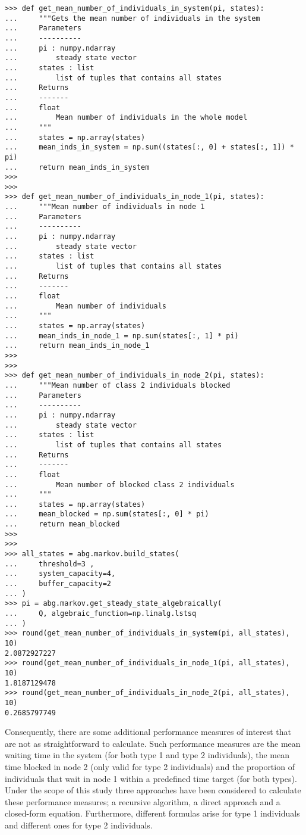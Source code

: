 \begin{lstlisting}[style=pystyle]
>>> def get_mean_number_of_individuals_in_system(pi, states):
...     """Gets the mean number of individuals in the system
...     Parameters
...     ----------
...     pi : numpy.ndarray
...         steady state vector
...     states : list
...         list of tuples that contains all states
...     Returns
...     -------
...     float
...         Mean number of individuals in the whole model
...     """
...     states = np.array(states)
...     mean_inds_in_system = np.sum((states[:, 0] + states[:, 1]) * pi)
...     return mean_inds_in_system
>>>
>>>
>>> def get_mean_number_of_individuals_in_node_1(pi, states):
...     """Mean number of individuals in node 1
...     Parameters
...     ----------
...     pi : numpy.ndarray
...         steady state vector
...     states : list
...         list of tuples that contains all states
...     Returns
...     -------
...     float
...         Mean number of individuals
...     """
...     states = np.array(states)
...     mean_inds_in_node_1 = np.sum(states[:, 1] * pi)
...     return mean_inds_in_node_1
>>>
>>>
>>> def get_mean_number_of_individuals_in_node_2(pi, states):
...     """Mean number of class 2 individuals blocked
...     Parameters
...     ----------
...     pi : numpy.ndarray
...         steady state vector
...     states : list
...         list of tuples that contains all states
...     Returns
...     -------
...     float
...         Mean number of blocked class 2 individuals
...     """
...     states = np.array(states)
...     mean_blocked = np.sum(states[:, 0] * pi)
...     return mean_blocked
>>>
>>>
>>> all_states = abg.markov.build_states(
...     threshold=3 ,
...     system_capacity=4,
...     buffer_capacity=2
... )
>>> pi = abg.markov.get_steady_state_algebraically(
...     Q, algebraic_function=np.linalg.lstsq
... )
>>> round(get_mean_number_of_individuals_in_system(pi, all_states), 10)
2.0872927227
>>> round(get_mean_number_of_individuals_in_node_1(pi, all_states), 10)
1.8187129478
>>> round(get_mean_number_of_individuals_in_node_2(pi, all_states), 10)
0.2685797749

\end{lstlisting}


Consequently, there are some additional performance measures of interest that
are not as straightforward to calculate.
Such performance measures are the mean waiting time in the system (for both
type 1 and type 2 individuals), the mean time blocked in node 2 (only
valid for type 2 individuals) and the proportion of individuals that wait in
node 1 within a predefined time target (for both types).
Under the scope of this study three approaches have been considered to calculate
these performance measures; a recursive algorithm, a direct approach and
a closed-form equation. 
Furthermore, different formulas arise for type 1 individuals and different
ones for type 2 individuals.


